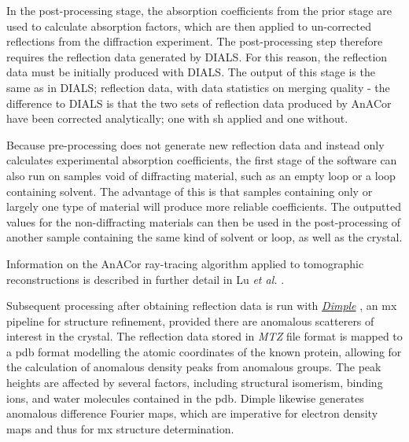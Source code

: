 
In the post-processing stage, the absorption coefficients from the prior stage are used to calculate absorption factors, which are then applied to un-corrected reflections from the diffraction experiment. The post-processing step therefore requires the reflection data generated by DIALS. For this reason, the reflection data must be initially produced with DIALS. The output of this stage is the same as in DIALS; reflection data, with data statistics on merging quality - the difference to DIALS is that the two sets of reflection data produced by AnACor have been corrected analytically; one with \ac{sh} applied and one without.

Because pre-processing does not generate new reflection data and instead only calculates experimental absorption coefficients, the first stage of the software can also run on samples void of diffracting material, such as an empty loop or a loop containing solvent. The advantage of this is that samples containing only or largely one type of material will produce more reliable coefficients. The outputted values for the non-diffracting materials can then be used in the post-processing of another sample containing the same kind of solvent or loop, as well as the crystal.

Information on the AnACor ray-tracing algorithm applied to tomographic reconstructions is described in further detail in Lu \textit{et al.} \cite{Lu2024}.

Subsequent processing after obtaining reflection data is run with \href{http://ccp4.github.io/dimple}{\textit{Dimple}} \cite{Thorn2011}, an \ac{mx} pipeline for structure refinement, provided there are anomalous scatterers of interest in the crystal. The reflection data stored in \textit{MTZ} file format is mapped to a \ac{pdb} format modelling the atomic coordinates of the known protein, allowing for the calculation of anomalous density peaks from anomalous groups. The peak heights are affected by several factors, including structural isomerism, binding ions, and water molecules contained in the \ac{pdb}. %
Dimple likewise generates anomalous difference Fourier maps, which are imperative for electron density maps and thus for \ac{mx} structure determination. %

